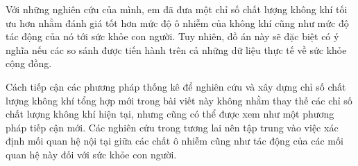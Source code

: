 \documentclass[14pt]{extreport}
\theoremstyle{definition}
\theoremstyle{plain}
\theoremstyle{remark}
\begin{document}
Với những nghiên cứu của mình, em đã đưa một chỉ số chất lượng không khí tối ưu hơn nhằm đánh giá tốt hơn mức độ ô nhiễm của không khí cũng như mức độ tác động của nó tới sức khỏe con người. Tuy nhiên, đồ án này sẽ đặc biệt có ý nghĩa nếu các so sánh được tiến hành trên cả những dữ liệu thực tế về sức khỏe cộng đồng. 

Cách tiếp cận các phương pháp thống kê để nghiên cứu và xây dựng chỉ số chất lượng không khí tổng hợp mới trong bài viết này không nhằm thay thế các chỉ số chất lượng không khí hiện tại, nhưng cũng có thể được xem như một phương pháp tiếp cận mới. Các nghiên cứu trong tương lai nên tập trung vào việc xác định mối quan hệ nội tại giữa các chất ô nhiễm cũng như tác động của các mối quan hệ này đối với sức khỏe con người. 

\end{document}
